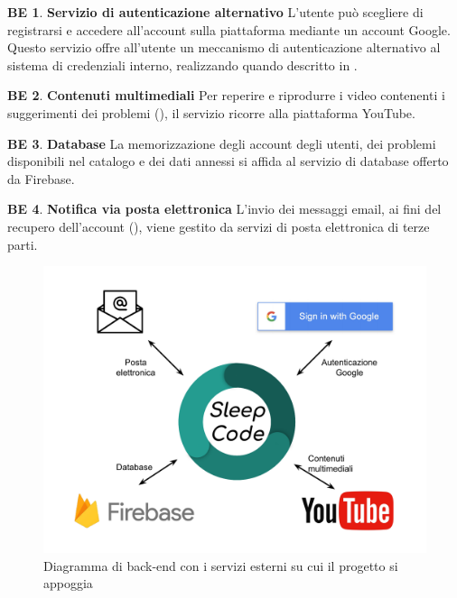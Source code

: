 \documentclass[11pt, a4paper]{article}
\theoremstyle{definition}
\newtheorem{backend}{BE}
\begin{document}
\begin{backend}
\textbf{Servizio di autenticazione alternativo }
L'utente può scegliere di registrarsi e accedere all'account sulla piattaforma
mediante un account Google. Questo servizio offre all'utente un meccanismo di
autenticazione alternativo al sistema di credenziali interno, realizzando quando
descritto in \textcolor{blue}{}.
\end{backend}

\begin{backend}
\textbf{Contenuti multimediali }
Per reperire e riprodurre i video contenenti i suggerimenti dei problemi (\textcolor{blue}{}),
il servizio ricorre alla piattaforma YouTube.
\end{backend}

\begin{backend}
\textbf{Database }
La memorizzazione degli account degli utenti, dei problemi disponibili
nel catalogo e dei dati annessi si affida al servizio di database offerto
da Firebase.
\end{backend}

\begin{backend}
\textbf{Notifica via posta elettronica }
L'invio dei messaggi email, ai fini del recupero dell'account (\textcolor{blue}{}), viene gestito da servizi di posta elettronica di terze parti.
\end{backend}

\begin{figure}[H]
\centering
\includegraphics[scale=0.35]{materiale/immaginife/backend.pdf}
\caption{Diagramma di back-end con i servizi esterni su cui il progetto si appoggia}
\label{backend}
\end{figure}
\end{document}
